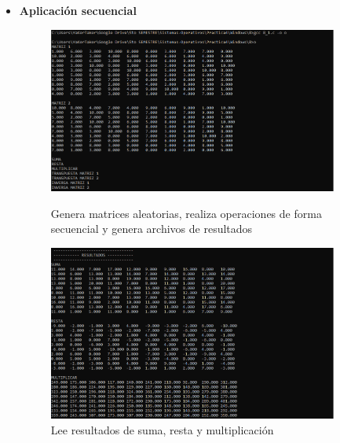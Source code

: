 \documentclass[12pt]{article}
\begin{document}
\begin{itemize}
                \begin{itemize}
                    \item \textbf{Aplicación secuencial}
                    \begin{figure}[h!]
                        \centering
                         \includegraphics[width=0.9\textwidth]{Practica4/Images/Windows/8_9.PNG}
                        \caption{Genera matrices aleatorias, realiza operaciones de forma secuencial y genera archivos de resultados}
                        
                        \includegraphics[width=0.9\textwidth]{Practica4/Images/Windows/8_10.PNG}
                        \caption{Lee resultados de suma, resta y multiplicación}
                        
                    \end{figure}
                    
                    \begin{figure}[h!]
                        \centering
                        

\end{figure}
\end{itemize}
\end{itemize}
\end{document}
